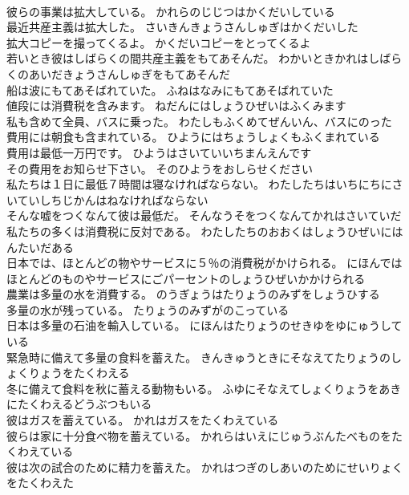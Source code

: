 \documentclass[8pt]{extreport}
\begin{document}
\begin{CJK}{UTF8}{min}
\\	彼らの事業は拡大している。	かれらのじじつはかくだいしている 
\\	最近共産主義は拡大した。	さいきんきょうさんしゅぎはかくだいした 
\\	拡大コピーを撮ってくるよ。	かくだいコピーをとってくるよ 
\\	若いとき彼はしばらくの間共産主義をもてあそんだ。	わかいときかれはしばらくのあいだきょうさんしゅぎをもてあそんだ 
\\	船は波にもてあそばれていた。	ふねはなみにもてあそばれていた 
\\	値段には消費税を含みます。	ねだんにはしょうひぜいはふくみます 
\\	私も含めて全員、バスに乗った。	わたしもふくめてぜんいん、バスにのった 
\\	費用には朝食も含まれている。	ひようにはちょうしょくもふくまれている 
\\	費用は最低一万円です。	ひようはさいていいちまんえんです 
\\	その費用をお知らせ下さい。	そのひようをおしらせください 
\\	私たちは１日に最低７時間は寝なければならない。	わたしたちはいちにちにさいていしちじかんはねなければならない 
\\	そんな嘘をつくなんて彼は最低だ。	そんなうそをつくなんてかれはさいていだ 
\\	私たちの多くは消費税に反対である。	わたしたちのおおくはしょうひぜいにはんたいだある 
\\	日本では、ほとんどの物やサービスに５％の消費税がかけられる。	にほんではほとんどのものやサービスにごパーセントのしょうひぜいかかけられる 
\\	農業は多量の水を消費する。	のうぎょうはたりょうのみずをしょうひする 
\\	多量の水が残っている。	たりょうのみずがのこっている 
\\	日本は多量の石油を輸入している。	にほんはたりょうのせきゆをゆにゅうしている 
\\	緊急時に備えて多量の食料を蓄えた。	きんきゅうときにそなえてたりょうのしょくりょうをたくわえる 
\\	冬に備えて食料を秋に蓄える動物もいる。	ふゆにそなえてしょくりょうをあきにたくわえるどうぶつもいる 
\\	彼はガスを蓄えている。	かれはガスをたくわえている 
\\	彼らは家に十分食べ物を蓄えている。	かれらはいえにじゅうぶんたべものをたくわえている 
\\	彼は次の試合のために精力を蓄えた。	かれはつぎのしあいのためにせいりょくをたくわえた 

\end{CJK}
\end{document}
